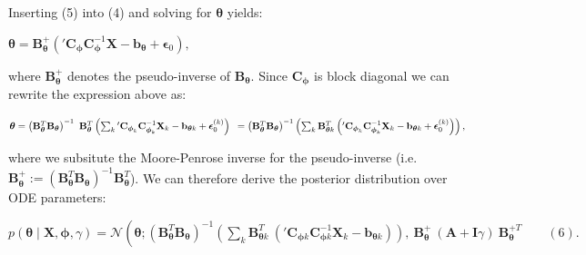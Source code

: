 \begin{par}
\begin{par}
Inserting (5) into (4) and solving for $\boldsymbol{\theta}$ yields:
\end{par} \vspace{1em}
\begin{par}
$\boldsymbol{\theta} = \mathbf{B}_{\boldsymbol{\theta}}^+ \left( {'\mathbf{C}_{\boldsymbol{\phi}}}\mathbf{C}_{\boldsymbol{\phi}}^{-1} \mathbf{X} - \mathbf{b}_{\boldsymbol{\theta}} + \boldsymbol{\epsilon}_0\right),$
\end{par} \vspace{1em}
\begin{par}
where $\mathbf{B}_{\boldsymbol{\theta}}^+$ denotes the pseudo-inverse of $\mathbf{B}_{\boldsymbol{\theta}}$. Since $\mathbf{C}_{\boldsymbol{\phi}}$ is block diagonal we can rewrite the expression above as:
\end{par} \vspace{1em}
\begin{par}
$\boldsymbol{\theta} = \left( \mathbf{B}_{\boldsymbol{\theta}}^T \mathbf{B}_{\boldsymbol{\theta}} \right)^{-1} ~\mathbf{B}_{\boldsymbol{\theta}}^T  \left( \sum_k {'\mathbf{C}_{\boldsymbol{\phi}_k}}\mathbf{C}_{\boldsymbol{\phi}_k}^{-1} \mathbf{X}_k - \mathbf{b}_{\boldsymbol{\theta} k} + \boldsymbol{\epsilon}_0^{(k)} \right)\\ ~= \left( \mathbf{B}_{\boldsymbol{\theta}}^T \mathbf{B}_{\boldsymbol{\theta}} \right)^{-1} \left(\sum_k \mathbf{B}_{\boldsymbol{\theta} k}^T \left( {'\mathbf{C}_{\boldsymbol{\phi}_k}}\mathbf{C}_{\boldsymbol{\phi}_k}^{-1} \mathbf{X}_k - \mathbf{b}_{\boldsymbol{\theta} k} +\boldsymbol{\epsilon}_0^{(k)} \right) \right),$
\end{par} \vspace{1em}
\begin{par}
where we subsitute the Moore-Penrose inverse for the pseudo-inverse (i.e. $\mathbf{B}_{\boldsymbol{\theta}}^+ := \left( \mathbf{B}_{\boldsymbol{\theta}}^T \mathbf{B}_{\boldsymbol{\theta}}\right)^{-1} \mathbf{B}_{\boldsymbol{\theta}}^T$). We can therefore derive the posterior distribution over ODE parameters:
\end{par} \vspace{1em}
\begin{par}
$p(\boldsymbol{\theta} \mid \mathbf{X}, \boldsymbol{\phi}, \gamma) = \mathcal{N}\left(\boldsymbol{\theta} ; \left( \mathbf{B}_{\boldsymbol{\theta}}^T\mathbf{B}_{\boldsymbol{\theta}} \right)^{-1} \left( \sum_k \mathbf{B}_{\boldsymbol{\theta} k}^T ~\left( {'\mathbf{C}_{\boldsymbol{\phi} k}} \mathbf{C}_{\boldsymbol{\phi} k}^{-1} \mathbf{X}_k -\mathbf{b}_{\boldsymbol{\theta} k} \right) \right), ~ \mathbf{B}_{\boldsymbol{\theta}}^+ ~(\mathbf{A} + \mathbf{I}\gamma) ~ \mathbf{B}_{\boldsymbol{\theta}}^{+T} \qquad (6).$
\end{par} 



\end{par}
